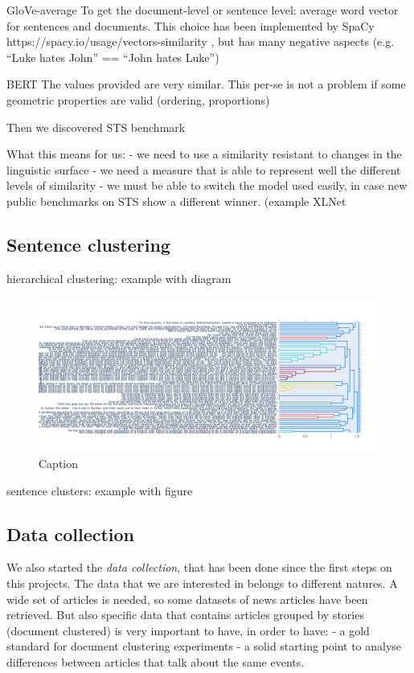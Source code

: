 GloVe-average
To get the document-level or sentence level: average word vector for sentences and documents. This choice has been implemented by SpaCy https://spacy.io/usage/vectors-similarity , but has many negative aspects (e.g. “Luke hates John” == “John hates Luke”) 

BERT
The values provided are very similar. This per-se is not a problem if some geometric properties are valid (ordering, proportions)


Then we discovered STS benchmark

What this means for us:
- we need to use a similarity resistant to changes in the linguistic surface
- we need a measure that is able to represent well the different levels of similarity
- we must be able to switch the model used easily, in case new public benchmarks on STS show a different winner. (example XLNet~\cite{yang2019xlnet}


\subsection{Sentence clustering}


hierarchical clustering: example with diagram
\begin{figure}[!htb]
    \centering
    \includegraphics[width=\linewidth]{figures/dendrogram.png}
    \caption{Caption}
    \label{fig:my_label}
\end{figure}

sentence clusters: example with figure



\subsection{Data collection}
We also started the \emph{data collection}, that has been done since the first steps on this projects.
The data that we are interested in belongs to different natures.
A wide set of articles is needed, so some datasets of news articles have been retrieved.
But also specific data that contains articles grouped by stories (document clustered) is very important to have, in order to have:
- a gold standard for document clustering experiments
- a solid starting point to analyse differences between articles that talk about the same events.

